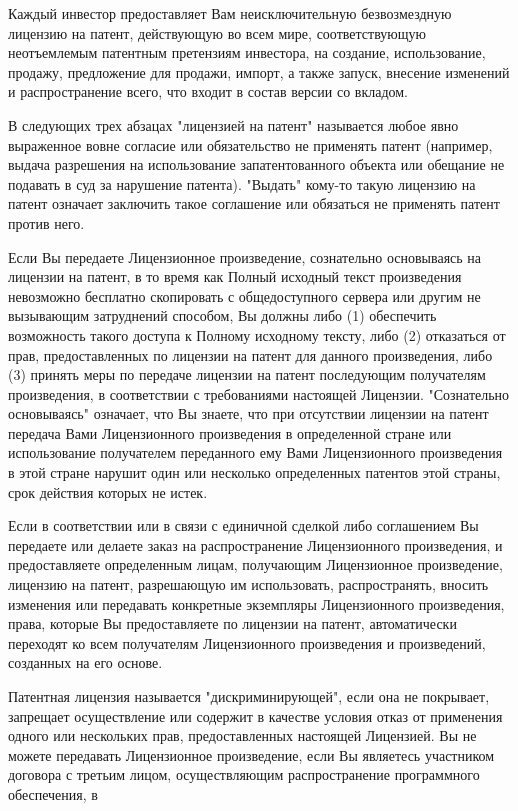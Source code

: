 Каждый инвестор предоставляет Вам неисключительную безвозмездную лицензию на патент, действующую во всем мире, соответствующую неотъемлемым патентным претензиям инвестора, на создание, использование, продажу, предложение для продажи, импорт, а также запуск, внесение изменений и распространение всего, что входит в состав версии со вкладом.

В следующих трех абзацах "{}лицензией на патент"{} называется любое явно выраженное вовне согласие или обязательство не применять патент (например, выдача разрешения на использование запатентованного объекта или обещание не подавать в суд за нарушение патента). "{}Выдать"{} кому-\/то такую лицензию на патент означает заключить такое соглашение или обязаться не применять патент против него.

Если Вы передаете Лицензионное произведение, сознательно основываясь на лицензии на патент, в то время как Полный исходный текст произведения невозможно бесплатно скопировать с общедоступного сервера или другим не вызывающим затруднений способом, Вы должны либо (1) обеспечить возможность такого доступа к Полному исходному тексту, либо (2) отказаться от прав, предоставленных по лицензии на патент для данного произведения, либо (3) принять меры по передаче лицензии на патент последующим получателям произведения, в соответствии с требованиями настоящей Лицензии. "{}Сознательно основываясь"{} означает, что Вы знаете, что при отсутствии лицензии на патент передача Вами Лицензионного произведения в определенной стране или использование получателем переданного ему Вами Лицензионного произведения в этой стране нарушит один или несколько определенных патентов этой страны, срок действия которых не истек.

Если в соответствии или в связи с единичной сделкой либо соглашением Вы передаете или делаете заказ на распространение Лицензионного произведения, и предоставляете определенным лицам, получающим Лицензионное произведение, лицензию на патент, разрешающую им использовать, распространять, вносить изменения или передавать конкретные экземпляры Лицензионного произведения, права, которые Вы предоставляете по лицензии на патент, автоматически переходят ко всем получателям Лицензионного произведения и произведений, созданных на его основе.

Патентная лицензия называется "{}дискриминирующей"{}, если она не покрывает, запрещает осуществление или содержит в качестве условия отказ от применения одного или нескольких прав, предоставленных настоящей Лицензией. Вы не можете передавать Лицензионное произведение, если Вы являетесь участником договора с третьим лицом, осуществляющим распространение программного обеспечения, в

